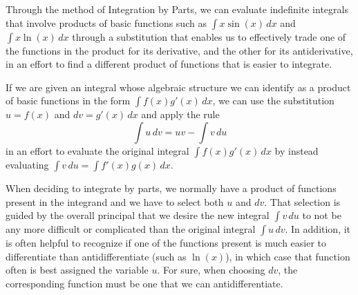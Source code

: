 \begin{summary}
\item Through the method of Integration by Parts, we can evaluate indefinite integrals that involve products of basic functions such as $\int x \sin(x) \, dx$ and $\int x \ln(x) \, dx$ through a substitution that enables us to effectively trade one of the functions in the product for its derivative, and the other for its antiderivative, in an effort to find a different product of functions that is easier to integrate.
\item If we are given an integral whose algebraic structure we can identify as a product of basic functions in the form $\int f(x) g'(x) \, dx$, we can use the substitution $u = f(x)$ and $dv = g'(x) \,dx$ and apply the rule
$$\int u \, dv = uv - \int v \, du$$
in an effort to evaluate the original integral $\int f(x) g'(x) \, dx$ by instead evaluating $\int v \, du = \int f'(x) g(x) \, dx$.
\item When deciding to integrate by parts, we normally have a product of functions present in the integrand and we have to select both $u$ and $dv$.  That selection is guided by the overall principal that we desire the new integral $\int v \, du$ to not be any more difficult or complicated than the original integral $\int u \, dv$.  In addition, it is often helpful to recognize if one of the functions present is much easier to differentiate than antidifferentiate (such as $\ln(x)$), in which case that function often is best assigned the variable $u$.  For sure, when choosing $dv$, the corresponding function must be one that we can antidifferentiate.
\end{summary}

\clearpage

 

\cleardoublepage